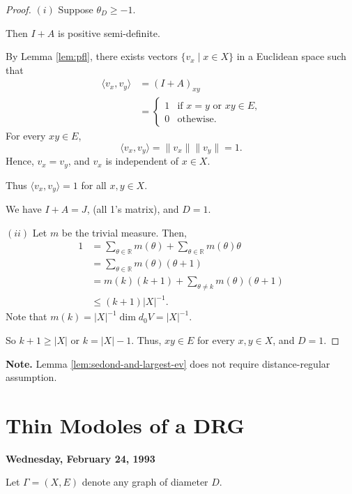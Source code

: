 \documentclass[
]{book}
\theoremstyle{definition}
\theoremstyle{definition}
\theoremstyle{definition}
\theoremstyle{definition}
\theoremstyle{remark}
\begin{document}
\begin{proof}
\((i)\) Suppose \(\theta_D \geq -1\).

Then \(I + A\) is positive semi-definite.

By Lemma \ref{lem:pfl}, there exists vectors \(\{v_x\mid x\in X\}\) in a Euclidean space such that
\begin{align}
\langle v_x,v_y\rangle & = (I+A)_{xy}\\
& = \begin{cases} 1 & \text{if $x = y$ or $xy\in E$,}\\0 & \text{othewise}.
\end{cases}
\end{align}
For every \(xy\in E\),
\[\langle v_x, v_y\rangle = \|v_x\|\|v_y\| = 1.\]
Hence, \(v_x = v_y\), and \(v_x\) is independent of \(x\in X\).

Thus \(\langle v_x,v_y\rangle = 1\) for all \(x,y\in X\).

We have \(I + A = J\), (all 1's matrix), and \(D = 1\).

\((ii)\) Let \(m\) be the trivial measure. Then,
\begin{align}
1 & = \sum_{\theta\in \mathbb{R}}m(\theta) + \sum_{\theta\in \mathbb{R}}m(\theta)\theta \\
& = \sum_{\theta\in \mathbb{R}}m(\theta)(\theta+1)\\
& = m(k)(k+1) + \sum_{\theta\neq k}m(\theta)(\theta+1)\\
& \leq (k+1)|X|^{-1}.
\end{align}
Note that \(m(k) = |X|^{-1}\dim d_0V = |X|^{-1}\).

So \(k+1 \geq |X|\) or \(k = |X|-1\). Thus,
\(xy\in E\) for every \(x,y\in X\), and \(D = 1\).
\end{proof}

\textbf{Note.}
Lemma \ref{lem:sedond-and-largest-ev} does not require distance-regular assumption.

\hypertarget{lec16}{%
\chapter{Thin Modoles of a DRG}\label{lec16}}

\textbf{Wednesday, February 24, 1993}

Let \(\Gamma = (X, E)\) denote any graph of diameter \(D\).
\end{document}
